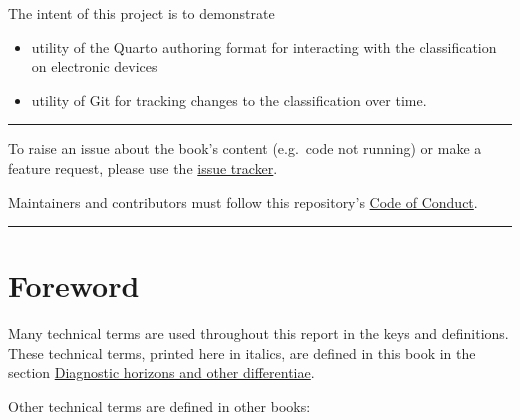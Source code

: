 \documentclass[
  letterpaper,
  DIV=11,
  numbers=noendperiod]{scrreprt}
\providecommand{\tightlist}{%
  \setlength{\itemsep}{0pt}\setlength{\parskip}{0pt}}\usepackage{longtable,booktabs,array}
\begin{document}
The intent of this project is to demonstrate

\begin{itemize}
\tightlist
\item
  utility of the Quarto authoring format for interacting with the
  classification on electronic devices
\item
  utility of Git for tracking changes to the classification over time.
\end{itemize}

\begin{center}\rule{0.5\linewidth}{0.5pt}\end{center}

To raise an issue about the book's content (e.g.~code not running) or
make a feature request, please use the
\href{https://github.com/manaakiwhenua/nzsc_bookdown/issues}{issue
tracker}.

Maintainers and contributors must follow this repository's \href{}{Code
of Conduct}.

\begin{center}\rule{0.5\linewidth}{0.5pt}\end{center}


\hypertarget{sec-foreword}{%
\chapter{Foreword}\label{sec-foreword}}

Many technical terms are used throughout this report in the keys and
definitions. These technical terms, printed here in italics, are defined
in this book in the section
\protect\hyperlink{sec-diagnostics}{Diagnostic horizons and other
differentiae}.

Other technical terms are defined in other books:
\end{document}
